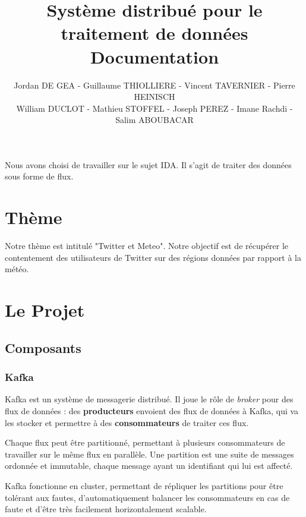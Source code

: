 \documentclass[a4paper,oneside,10pt]{article}
\title{Système distribué pour le traitement de données\\
Documentation
}
\author{Jordan DE GEA - Guillaume THIOLLIERE - Vincent TAVERNIER - Pierre HEINISCH\\
William DUCLOT - Mathieu STOFFEL - Joseph PEREZ - Imane Rachdi - Salim ABOUBACAR}
\begin{document}
\maketitle

Nous avons choisi de travailler sur le sujet IDA. Il s'agit de traiter des données sous forme de flux. \\

\section{Thème} 

Notre thème est intitulé "Twitter et Meteo". Notre objectif est de récupérer le contentement des utilisateurs de Twitter sur des régions données par rapport à la météo. 

\section{Le Projet}

\subsection{Composants}

\subsubsection{Kafka}

Kafka est un système de messagerie distribué. Il joue le r\^ole de \textit{broker} pour des flux de données : des \textbf{producteurs} envoient des flux de données à Kafka, qui va les stocker et permettre à des \textbf{consommateurs} de traiter ces flux.

Chaque flux peut \^etre partitionné, permettant à plusieurs consommateurs de travailler sur le m\^eme flux en parallèle. Une partition est une suite de messages ordonnée et immutable, chaque message ayant un identifiant qui lui est affecté.

Kafka fonctionne en cluster, permettant de répliquer les partitions pour être tolérant aux fautes, d'automatiquement balancer les consommateurs en cas de faute et d'être très facilement horizontalement scalable.
\end{document}
